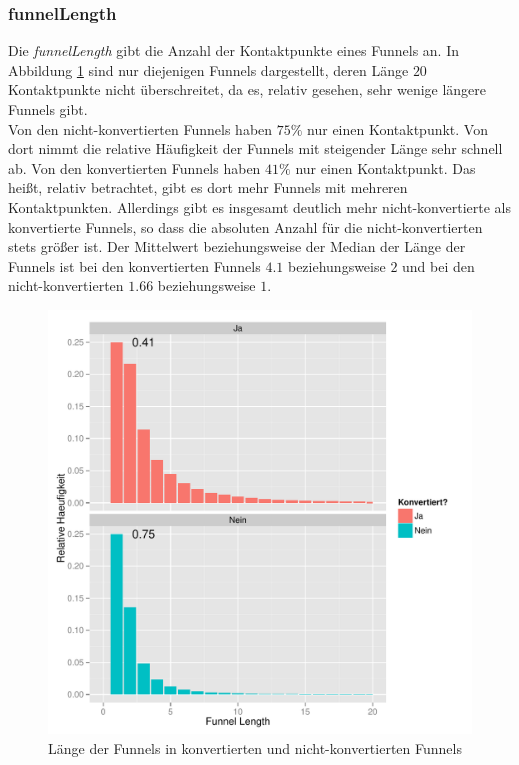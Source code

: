 \subsubsection*{funnelLength}
Die \textit{funnelLength} gibt die Anzahl der Kontaktpunkte eines Funnels an. In Abbildung \ref{funnelLength} sind nur diejenigen Funnels dargestellt, deren Länge $20$ Kontaktpunkte nicht überschreitet, da es, relativ gesehen, sehr wenige längere Funnels gibt.\\
Von den nicht-konvertierten Funnels haben $75 \%$ nur einen Kontaktpunkt. Von dort nimmt die relative Häufigkeit der Funnels mit steigender Länge sehr schnell ab. Von den konvertierten Funnels haben $41 \%$ nur einen Kontaktpunkt. Das heißt, relativ betrachtet, gibt es dort mehr Funnels mit mehreren Kontaktpunkten. Allerdings gibt es insgesamt deutlich mehr nicht-konvertierte als konvertierte Funnels, so dass die absoluten Anzahl für die nicht-konvertierten stets größer ist. Der Mittelwert beziehungsweise der Median der Länge der Funnels ist bei den konvertierten Funnels $4.1$ beziehungsweise $2$ und bei den nicht-konvertierten $1.66$ beziehungsweise $1$. 

\begin{figure}[H]
    \centering
    \includegraphics[scale=0.5]{funnelLength_First.pdf}
    \caption{Länge der Funnels in konvertierten und nicht-konvertierten Funnels}
    \label{funnelLength}
\end{figure}

